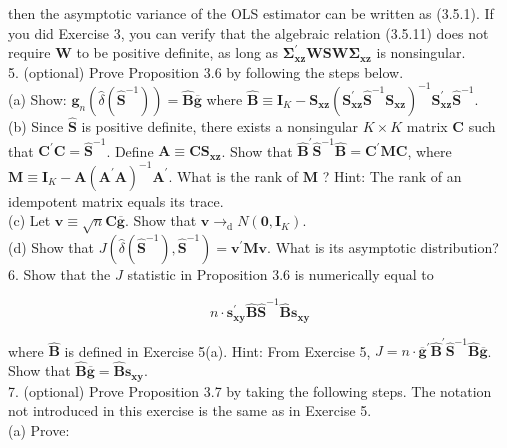 \documentclass[10pt]{article}
\begin{document}
then the asymptotic variance of the OLS estimator can be written as (3.5.1). If you did Exercise 3, you can verify that the algebraic relation (3.5.11) does not require $\mathbf{W}$ to be positive definite, as long as $\boldsymbol{\Sigma}_{\mathbf{x z}}^{\prime} \mathbf{W S W} \boldsymbol{\Sigma}_{\mathbf{x z}}$ is nonsingular.\\
5. (optional) Prove Proposition 3.6 by following the steps below.\\
(a) Show: $\mathbf{g}_{n}\left(\hat{\delta}\left(\widehat{\mathbf{S}}^{-1}\right)\right)=\widehat{\mathbf{B}} \overline{\mathbf{g}}$ where $\widehat{\mathbf{B}} \equiv \mathbf{I}_{K}-\mathbf{S}_{\mathbf{x z}}\left(\mathbf{S}_{\mathbf{x z}}^{\prime} \widehat{\mathbf{S}}^{-1} \mathbf{S}_{\mathbf{x z}}\right)^{-1} \mathbf{S}_{\mathbf{x z}}^{\prime} \widehat{\mathbf{S}}^{-1}$.\\
(b) Since $\widehat{\mathbf{S}}$ is positive definite, there exists a nonsingular $K \times K$ matrix $\mathbf{C}$ such that $\mathbf{C}^{\prime} \mathbf{C}=\widehat{\mathbf{S}}^{-1}$. Define $\mathbf{A} \equiv \mathbf{C S}_{\mathbf{x z}}$. Show that $\widehat{\mathbf{B}}^{\prime} \widehat{\mathbf{S}}^{-1} \widehat{\mathbf{B}}=\mathbf{C}^{\prime} \mathbf{M C}$, where $\mathbf{M} \equiv \mathbf{I}_{K}-\mathbf{A}\left(\mathbf{A}^{\prime} \mathbf{A}\right)^{-1} \mathbf{A}^{\prime}$. What is the rank of $\mathbf{M}$ ? Hint: The rank of an idempotent matrix equals its trace.\\
(c) Let $\mathbf{v} \equiv \sqrt{n} \mathbf{C} \overline{\mathbf{g}}$. Show that $\mathbf{v} \rightarrow_{\mathrm{d}} N\left(\mathbf{0}, \mathbf{I}_{K}\right)$.\\
(d) Show that $J\left(\hat{\delta}\left(\widehat{\mathbf{S}}^{-1}\right), \widehat{\mathbf{S}}^{-1}\right)=\mathbf{v}^{\prime} \mathbf{M v}$. What is its asymptotic distribution?\\
6. Show that the $J$ statistic in Proposition 3.6 is numerically equal to

$$
n \cdot \mathbf{s}_{\mathbf{x y}}^{\prime} \widehat{\mathbf{B}} \widehat{\mathbf{S}}^{-1} \widehat{\mathbf{B}} \mathbf{s}_{\mathbf{x y}}
$$

where $\widehat{\mathbf{B}}$ is defined in Exercise 5(a). Hint: From Exercise 5, $J=n \cdot \overline{\mathbf{g}}^{\prime} \widehat{\mathbf{B}}^{\prime} \widehat{\mathbf{S}}^{-1} \widehat{\mathbf{B}} \overline{\mathbf{g}}$. Show that $\widehat{\mathbf{B}} \overline{\mathbf{g}}=\widehat{\mathbf{B}} \mathbf{s}_{\mathbf{x y}}$.\\
7. (optional) Prove Proposition 3.7 by taking the following steps. The notation not introduced in this exercise is the same as in Exercise 5.\\
(a) Prove:
\end{document}
